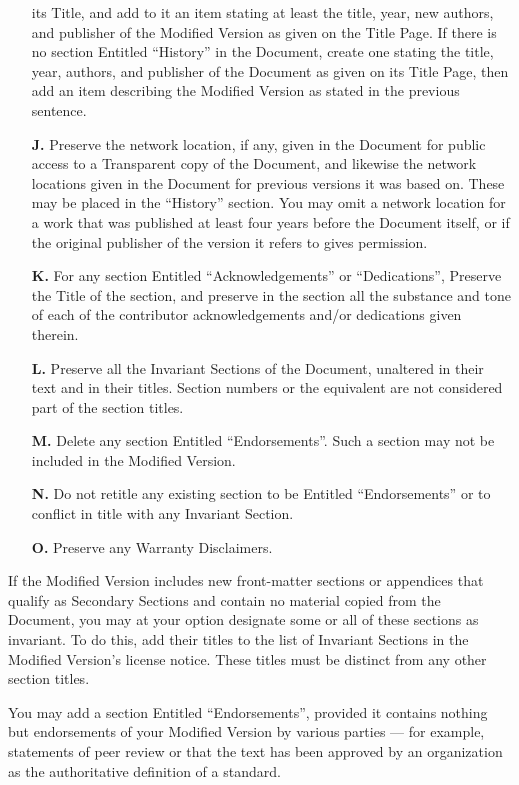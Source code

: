 \begin{itemize}
  its Title, and add to it an item stating at least the title, year,
  new authors, and publisher of the Modified Version as given on the
  Title Page. If there is no section Entitled ``History'' in the
  Document, create one stating the title, year, authors, and publisher
  of the Document as given on its Title Page, then add an item
  describing the Modified Version as stated in the previous sentence.
\item[\textbf{J.}] Preserve the network location, if any, given in the
  Document for public access to a Transparent copy of the Document,
  and likewise the network locations given in the Document for
  previous versions it was based on. These may be placed in the
  ``History'' section. You may omit a network location for a work that
  was published at least four years before the Document itself, or if
  the original publisher of the version it refers to gives permission.
\item[\textbf{K.}] For any section Entitled ``Acknowledgements'' or
  ``Dedications'', Preserve the Title of the section, and preserve in
  the section all the substance and tone of each of the contributor
  acknowledgements and/or dedications given therein.
\item[\textbf{L.}] Preserve all the Invariant Sections of the
  Document, unaltered in their text and in their titles. Section
  numbers or the equivalent are not considered part of the section
  titles.
\item[\textbf{M.}] Delete any section Entitled ``Endorsements''.
  Such a section may not be included in the Modified Version.
\item[\textbf{N.}] Do not retitle any existing section to be Entitled
  ``Endorsements'' or to conflict in title with any Invariant Section.
\item[\textbf{O.}] Preserve any Warranty Disclaimers.
\end{itemize}

If the Modified Version includes new front-matter sections or
appendices that qualify as Secondary Sections and contain no material
copied from the Document, you may at your option designate some or all
of these sections as invariant. To do this, add their titles to the
list of Invariant Sections in the Modified Version's license notice.
These titles must be distinct from any other section titles.

You may add a section Entitled ``Endorsements'', provided it contains
nothing but endorsements of your Modified Version by various parties
--- for example, statements of peer review or that the text has been
approved by an organization as the authoritative definition of a
standard.


